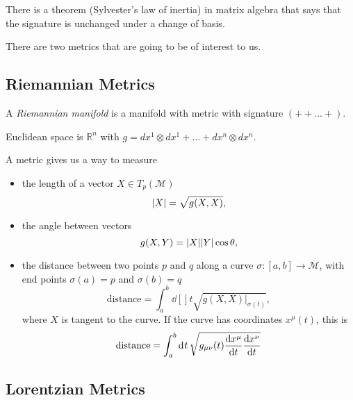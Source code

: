 \begin{leftbar}
  \begin{remark}
    There is a theorem (Sylvester's law of inertia) in matrix algebra that says that the signature is unchanged under a change of basis.
  \end{remark}
\end{leftbar}

There are two metrics that are going to be of interest to us.

\subsection{Riemannian Metrics}%
\label{sub:riemannian_metrics}

\begin{definition}
  A \emph{Riemannian manifold} is a manifold with metric with signature $(+ + \dots +)$.
\end{definition}
\begin{example}[]
  Euclidean space is $\mathbb{R}^n$ with $g = dx^1 \otimes dx^1 + \dots + dx^n \otimes dx^n$.
\end{example}

A metric gives us a way to measure 
\begin{itemize}
  \item the length of a vector $X \in T_p(\mathcal{M})$
  \begin{equation}
    \abs{X} = \sqrt{g(X, X)},
  \end{equation}
  \item the angle between vectors
  \begin{equation}
    g(X, Y) = \abs{X} \abs{Y} \cos\theta,
  \end{equation}
\item the distance between two points $p$ and $q$ along a curve $\sigma\colon [a, b] \to \mathcal{M}$, with end points $\sigma(a) = p$ and $\sigma(b) = q$
  \begin{equation}
    \text{distance} = \int_{a}^{b} \dd[]{t} \sqrt{g(X, X) \rvert_{\sigma(t)}},
  \end{equation}
  where $X$ is tangent to the curve.
  If the curve has coordinates $x^\mu(t)$, this is
  \begin{equation}
    \text{distance} = \int_{a}^{b} \dd[]{t} \sqrt{g_{\mu\nu}(t) \dv{x^\mu}{t} \dv{x^\nu}{t}}
  \end{equation}
\end{itemize}

\subsection{Lorentzian Metrics}%
\label{sub:lorentzian_metrics}


